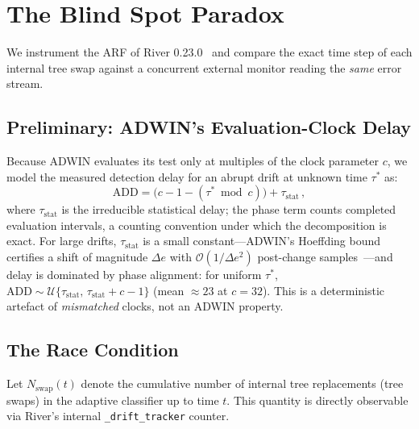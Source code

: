 \documentclass[10pt,conference]{IEEEtran}
\theoremstyle{definition}
\begin{document}
\section{The Blind Spot Paradox}\label{sec:blindspot}

We instrument the ARF of River 0.23.0~\cite{montiel_river_2021} and compare the exact time step of each internal tree swap against a concurrent external monitor reading the \emph{same} error stream.

\subsection{Preliminary: ADWIN's Evaluation-Clock Delay}\label{sec:clock}

Because ADWIN evaluates its test only at multiples of the clock parameter $c$, we model the measured detection delay for an abrupt drift at unknown time $\tau^*$ as:
\begin{equation}\label{eq:clock}
  \mathrm{ADD} = \bigl(c - 1 - (\tau^* \bmod c)\bigr) + \tau_{\mathrm{stat}}\,,
\end{equation}
where $\tau_{\mathrm{stat}}$ is the irreducible statistical delay; the phase term counts completed evaluation intervals, a counting convention under which the decomposition is exact. For large drifts, $\tau_{\mathrm{stat}}$ is a small constant---ADWIN's Hoeffding bound certifies a shift of magnitude $\Delta e$ with $\mathcal{O}(1/\Delta e^{2})$ post-change samples~\cite{bifet_adwin_2007}---and delay is dominated by phase alignment: for uniform $\tau^*$, $\mathrm{ADD} \sim \mathcal{U}\{\tau_{\mathrm{stat}},\, \tau_{\mathrm{stat}} + c - 1\}$ (mean ${\approx}23$ at $c{=}32$). This is a deterministic artefact of \emph{mismatched} clocks, not an ADWIN property.

\subsection{The Race Condition}\label{sec:race}

Let $N_{\mathrm{swap}}(t)$ denote the cumulative number of internal tree replacements (tree swaps) in the adaptive classifier up to time $t$. This quantity is directly observable via River's internal \texttt{\_drift\_tracker} counter.
\end{document}
